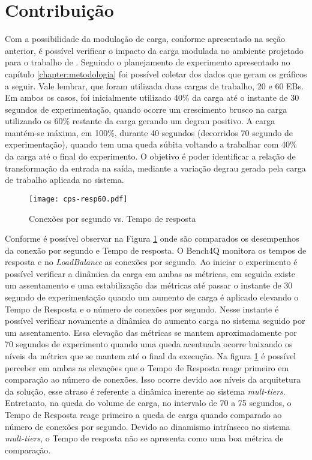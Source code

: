 \section{Contribuição}
Com a possibilidade da modulação de carga, conforme apresentado na seção anterior, é possível verificar o impacto da carga modulada no ambiente projetado para o trabalho de . Seguindo o planejamento de experimento apresentado no capítulo \ref{chapter:metodologia} foi possível coletar dos dados que geram os gráficos a seguir.
Vale lembrar, que foram utilizada duas cargas de trabalho, 20 e 60 EBs. Em ambos os casos, foi inicialmente utilizado 40\% da carga até o instante de 30 segundos de experimentação, quando ocorre um crescimento brusco na carga utilizando os 60\% restante da carga gerando um degrau positivo. A carga mantém-se máxima, em 100\%, durante 40 segundos (decorridos 70 segundo de experimentação), quando tem uma queda súbita voltando a trabalhar com 40\% da carga até o final do experimento. O objetivo é poder identificar a relação de transformação da entrada na saída, mediante a variação degrau gerada pela carga de trabalho aplicada no sistema.

\begin{figure}[htb]
	\centering
	\texttt{[image: cps-resp60.pdf]}	
	\caption{Conexões por segundo vs. Tempo de resposta}
	\label{fig:cps-resp60}
	\fdadospesquisa
\end{figure}

Conforme é possível observar na Figura \ref{fig:cps-resp60} onde são comparados os desempenhos da conexão por segundo e Tempo de resposta. O Bench4Q monitora os tempos de resposta e no \textit{LoadBalance} as conexões por segundo. Ao iniciar o experimento é possível verificar a dinâmica da carga em ambas as métricas, em seguida existe um assentamento e uma estabilização das métricas até passar o instante de 30 segundo de experimentação quando um aumento de carga é aplicado elevando o Tempo de Resposta e o número de conexões por segundo. Nesse instante é possível verificar novamente a dinâmica do aumento carga no sistema seguido por um assentamento. Essa elevação das métricas se mantem aproximadamente por 70 segundos de experimento quando uma queda acentuada ocorre baixando os níveis da métrica que se mantem até o final da execução. 
Na figura \ref{fig:cps-resp60} é possível perceber em ambas as elevações que o Tempo de Resposta reage primeiro em comparação ao número de conexões. Isso ocorre devido aos níveis da arquitetura da solução, esse atraso é referente a dinâmica inerente ao sistema \textit{mult-tiers}. Entretanto, na queda do volume de carga, no intervalo de 70 a 75 segundos, o Tempo de Resposta reage primeiro a queda de carga quando comparado ao número de conexões por segundo. Devido ao dinamismo intrínseco no sistema \textit{mult-tiers}, o Tempo de resposta não se apresenta como uma boa métrica de comparação. 

